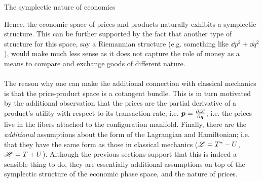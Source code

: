 \begin{econ}{The symplectic nature of economics}
\begin{itemize}
    \end{itemize}
    Hence, the economic space of prices and products naturally exhibits a symplectic structure. This can be further supported by the fact that another type of structure for this space, say a Riemannian structure (e.g. something like $\dd{p}^2 + \dd{q}^2$), would make much less sense as it does not capture the role of money as a means to compare and exchange goods of different nature.
    \\~\\ 
    The reason why one can make the additional connection with classical mechanics is that the price-product space is a cotangent bundle. This is in turn motivated by the additional observation that the prices are the partial derivative of a product's utility with respect to its transaction rate, i.e. $\vb*{p} = \pdv{\ensuremath{\mathscr{L}}}{\ensuremath{\dot{\vb*{q}}}}$, i.e. the prices live in the fibers attached to the configuration manifold. Finally, there are the \emph{additional} assumptions about the form of the Lagrangian and Hamiltonian; i.e. that they have the same form as those in classical mechanics ($\mathscr{L} = T^* - U$, $\mathscr{H} = T + U$). Although the previous sections support that this is indeed a sensible thing to do, they are essentially additional assumptions on top of the symplectic structure of the economic phase space, and the nature of prices. 
\end{econ}

